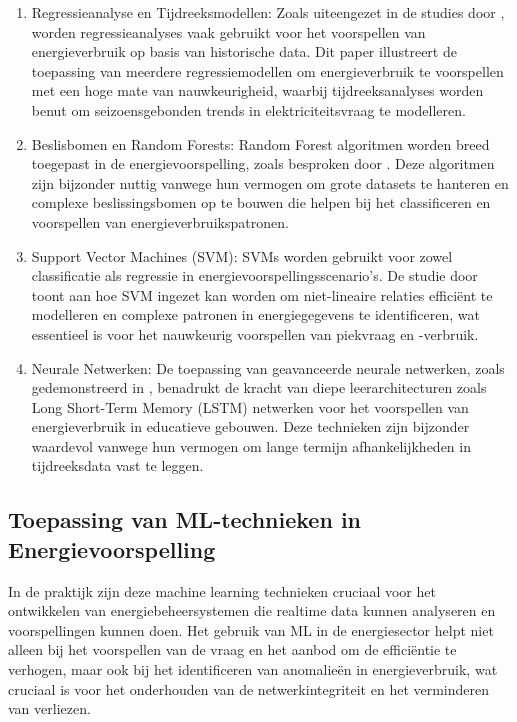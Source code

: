 \begin{enumerate}
    \item Regressieanalyse en Tijdreeksmodellen: Zoals uiteengezet in de studies door \textcite{Reddy_2023}, worden regressieanalyses vaak gebruikt voor het voorspellen van energieverbruik op basis van historische data. Dit paper illustreert de toepassing van meerdere regressiemodellen om energieverbruik te voorspellen met een hoge mate van nauwkeurigheid, waarbij tijdreeksanalyses worden benut om seizoensgebonden trends in elektriciteitsvraag te modelleren.
    \item Beslisbomen en Random Forests: Random Forest algoritmen worden breed toegepast in de energievoorspelling, zoals besproken door \textcite{Reddy_2023}. Deze algoritmen zijn bijzonder nuttig vanwege hun vermogen om grote datasets te hanteren en complexe beslissingsbomen op te bouwen die helpen bij het classificeren en voorspellen van energieverbruikspatronen.
    \item Support Vector Machines (SVM): SVMs worden gebruikt voor zowel classificatie als regressie in energievoorspellingsscenario's. De studie door \textcite{Reddy_2023} toont aan hoe SVM ingezet kan worden om niet-lineaire relaties efficiënt te modelleren en complexe patronen in energiegegevens te identificeren, wat essentieel is voor het nauwkeurig voorspellen van piekvraag en -verbruik.
    \item Neurale Netwerken: De toepassing van geavanceerde neurale netwerken, zoals gedemonstreerd in \textcite{Alanbar_2020}, benadrukt de kracht van diepe leerarchitecturen zoals Long Short-Term Memory (LSTM) netwerken voor het voorspellen van energieverbruik in educatieve gebouwen. Deze technieken zijn bijzonder waardevol vanwege hun vermogen om lange termijn afhankelijkheden in tijdreeksdata vast te leggen.
\end{enumerate}

\subsection{Toepassing van ML-technieken in Energievoorspelling}
In de praktijk zijn deze machine learning technieken cruciaal voor het ontwikkelen van energiebeheersystemen die realtime data kunnen analyseren en voorspellingen kunnen doen. Het gebruik van ML in de energiesector helpt niet alleen bij het voorspellen van de vraag en het aanbod om de efficiëntie te verhogen, maar ook bij het identificeren van anomalieën in energieverbruik, wat cruciaal is voor het onderhouden van de netwerkintegriteit en het verminderen van verliezen.

